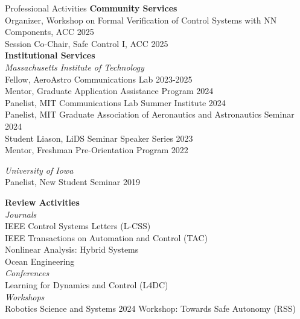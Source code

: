 \begin{rSection}{Professional Activities}
    \textbf{Community Services}\\
    Organizer,  Workshop on Formal Verification of Control Systems with NN Components, ACC \hfill 2025\\
    Session Co-Chair, Safe Control I, ACC \hfill 2025\\

    \pagebreak
    \textbf{Institutional Services}\\
    \textit{Massachusetts Institute of Technology}\\
    Fellow, AeroAstro Communications Lab \hfill 2023-2025\\
    Mentor, Graduate Application Assistance Program \hfill 2024\\
    Panelist, MIT Communications Lab Summer Institute \hfill 2024\\
    Panelist, MIT Graduate Association of Aeronautics and Astronautics Seminar \hfill 2024\\
    Student Liason, LiDS Seminar Speaker Series \hfill 2023\\
    Mentor, Freshman Pre-Orientation Program \hfill 2022

    \textit{University of Iowa}\\
    Panelist, New Student Seminar \hfill 2019

    \textbf{Review Activities}\\
    \textit{Journals}\\
    IEEE Control Systems Letters (L-CSS)\\
    IEEE Transactions on Automation and Control (TAC)\\
    Nonlinear Analysis: Hybrid Systems\\
    Ocean Engineering \\

    \textit{Conferences}\\
    Learning for Dynamics and Control (L4DC)\\

    \textit{Workshops}\\
    Robotics Science and Systems 2024 Workshop: Towards Safe Autonomy (RSS)

\end{rSection}
